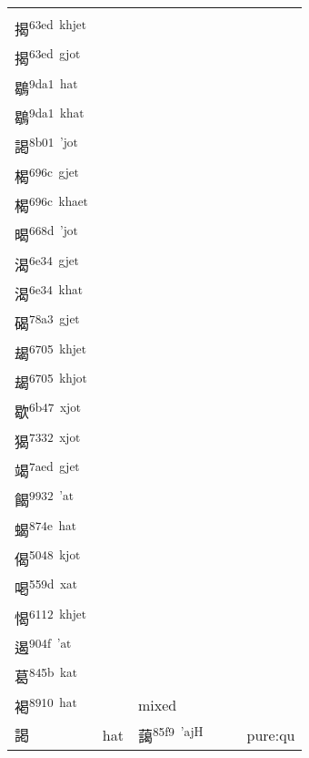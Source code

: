 \documentclass[14pt,a4paper]{scrartcl}
\begin{document}
\begin{longtable}[c]{@{}llllll@{}}
\begin{minipage}[t]{0.14\columnwidth}
揭\textsuperscript{63ed~kjot}\\
揭\textsuperscript{63ed~khjet}\\
揭\textsuperscript{63ed~gjot}\\
鶡\textsuperscript{9da1~hat}\\
鶡\textsuperscript{9da1~khat}\\
謁\textsuperscript{8b01~'jot}\\
楬\textsuperscript{696c~gjet}\\
楬\textsuperscript{696c~khaet}\\
暍\textsuperscript{668d~'jot}\\
渴\textsuperscript{6e34~gjet}\\
渴\textsuperscript{6e34~khat}\\
碣\textsuperscript{78a3~gjet}\\
朅\textsuperscript{6705~khjet}\\
朅\textsuperscript{6705~khjot}\\
歇\textsuperscript{6b47~xjot}\\
猲\textsuperscript{7332~xjot}\\
竭\textsuperscript{7aed~gjet}\\
餲\textsuperscript{9932~'at}\\
蝎\textsuperscript{874e~hat}\\
偈\textsuperscript{5048~kjot}\\
喝\textsuperscript{559d~xat}\\
愒\textsuperscript{6112~khjet}\\
遏\textsuperscript{904f~'at}\\
葛\textsuperscript{845b~kat}\\
褐\textsuperscript{8910~hat}
\strut\end{minipage} &
\begin{minipage}[t]{0.14\columnwidth}\raggedright\strut
\strut\end{minipage} &
\begin{minipage}[t]{0.14\columnwidth}\raggedright\strut
mixed
\strut\end{minipage}\tabularnewline
\begin{minipage}[t]{0.14\columnwidth}\raggedright\strut
謁
\strut\end{minipage} &
\begin{minipage}[t]{0.14\columnwidth}\raggedright\strut
hat
\strut\end{minipage} &
\begin{minipage}[t]{0.14\columnwidth}\raggedright\strut
藹\textsuperscript{85f9~'ajH}
\strut\end{minipage} &
\begin{minipage}[t]{0.14\columnwidth}\raggedright\strut
\strut\end{minipage} &
\begin{minipage}[t]{0.14\columnwidth}\raggedright\strut
\strut\end{minipage} &
\begin{minipage}[t]{0.14\columnwidth}\raggedright\strut
pure:qu
\strut\end{minipage}\tabularnewline
\bottomrule
\end{longtable}
\end{document}
